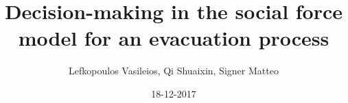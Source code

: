 \documentclass[aspectratio=43]{beamer}
\author[LQS]{Lefkopoulos Vasileios, Qi Shuaixin, Signer Matteo}
\title{Decision-making in the social force model for an evacuation process}
\date{18-12-2017}
\begin{document}
\titleframe
\end{document}

